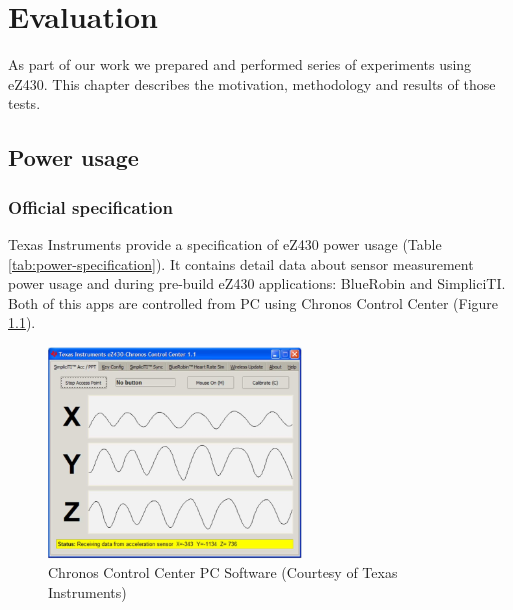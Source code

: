 \chapter{Evaluation}

As part of our work we prepared and performed series of experiments using eZ430.
This chapter describes the motivation, methodology and results of those tests.  

\section{Power usage}

\subsection{Official specification}
Texas Instruments provide a specification of eZ430 power usage (Table \ref{tab:power-specification}).
It contains detail data about sensor measurement power usage and during pre-build eZ430 applications: BlueRobin and SimpliciTI.
Both of this apps are controlled from PC using Chronos Control Center (Figure \ref{fig:chronos_control_center}).

\begin{figure}[h]
  \centering
  \includegraphics[width=0.6\textwidth]{img/chronos_app_control_center.png}
  \caption{Chronos Control Center PC Software (Courtesy of Texas
  Instruments)}
  \label{fig:chronos_control_center}
\end{figure}


